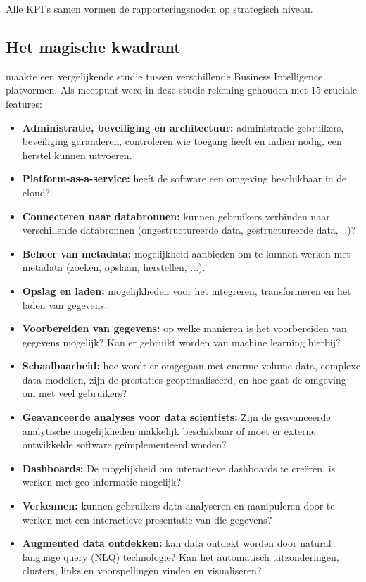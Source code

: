Alle KPI's samen vormen de rapporteringsnoden op strategisch niveau.

\subsection{Het magische kwadrant}
\textcite{Gartner2019} maakte een vergelijkende studie tussen verschillende Business Intelligence platvormen. Als meetpunt werd in deze studie rekening gehouden met 15 cruciale features:
\begin{itemize}
	\item \textbf{Administratie, beveiliging en architectuur:} administratie gebruikers, beveiliging garanderen, controleren wie toegang heeft en indien nodig, een herstel kunnen uitvoeren.
	\item \textbf{Platform-as-a-service:} heeft de software een omgeving beschikbaar in de cloud?
	\item \textbf{Connecteren naar databronnen:} kunnen gebruikers verbinden naar verschillende databronnen (ongestructureerde data, gestructureerde data, ..)?
	\item \textbf{Beheer van metadata:} mogelijkheid aanbieden om te kunnen werken met metadata (zoeken, opslaan, herstellen, ...).
	\item \textbf{Opslag en laden:} mogelijkheden voor het integreren, transformeren en het laden van gegevens.
	\item \textbf{Voorbereiden van gegevens:}  op welke manieren is het voorbereiden van gegevens mogelijk? Kan er gebruikt worden van machine learning hierbij?
	\item \textbf{Schaalbaarheid:} hoe wordt er omgegaan met enorme volume data, complexe data modellen, zijn de prestaties geoptimaliseerd, en hoe gaat de omgeving om met veel gebruikers?
	\item \textbf{Geavanceerde analyses voor data scientists:} Zijn de geavanceerde analytische mogelijkheden makkelijk beschikbaar of moet er externe ontwikkelde software geïmplementeerd worden?
	\item \textbf{Dashboards:} De mogelijkheid om interactieve dashboards te creëren, is werken met geo-informatie mogelijk?
	\item \textbf{Verkennen:} kunnen gebruikers data analyseren en manipuleren door te werken met een interactieve presentatie van die gegevens?
	\item \textbf{Augmented data ontdekken:} kan data ontdekt worden door natural language query (NLQ) technologie? Kan het automatisch uitzonderingen, clusters, links en voorspellingen vinden en visualiseren?

\end{itemize}
